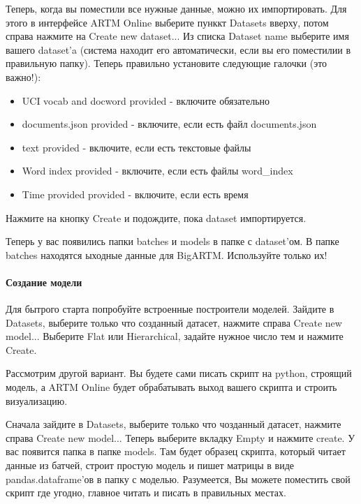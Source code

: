 \documentclass[letterpaper,10pt,english]{sphinxmanual}
\begin{document}
Теперь, когда вы поместили все нужные данные, можно их импортировать. Для этого в интерфейсе ARTM Online выберите пунккт Datasets вверху, потом справа
нажмите на Create new dataset... Из списка Dataset name выберите имя вашего dataset'a (система находит его автоматически,
если вы его поместилии в правильную папку). Теперь правильно установите следующие галочки (это важно!):
\begin{itemize}
\item {} 
UCI vocab and docword provided - включите обязательно

\item {} 
documents.json provided - включите, если есть файл documents.json

\item {} 
text provided - включите, если есть текстовые файлы

\item {} 
Word index provided - включите, если есть файлы word\_index

\item {} 
Time provided provided - включите, если есть время

\end{itemize}

Нажмите на кнопку Create и подождите, пока dataset импортируется.

Теперь у вас появились папки batches и models в папке с dataset'ом. В папке batches находятся ыходные данные для BigARTM. Используйте только их!
\paragraph{Создание модели}

Для бытрого старта попробуйте встроенные построители моделей.
Зайдите в Datasets, выберите только что созданный датасет, нажмите справа Create new model...
Выберите Flat или Hierarchical, задайте нужное число тем и нажмите Create.

Рассмотрим другой вариант. Вы будете сами писать
скрипт на python, строящий модель,
а ARTM Online будет обрабатывать выход вашего скрипта и строить визуализацию.

Сначала зайдите в Datasets, выберите только что чозданный датасет, нажмите справа Create new model... Теперь выберите вкладку Empty и нажмите create.
У вас появится папка в папке models. Там будет образец скрипта, который читает данные из батчей, строит простую модель и пишет матрицы в виде
pandas.dataframe'ов в папку с моделью. Разумеется, Вы можете поместить свой скрипт где угодно, главное читать и писать в правильных местах.
\end{document}
